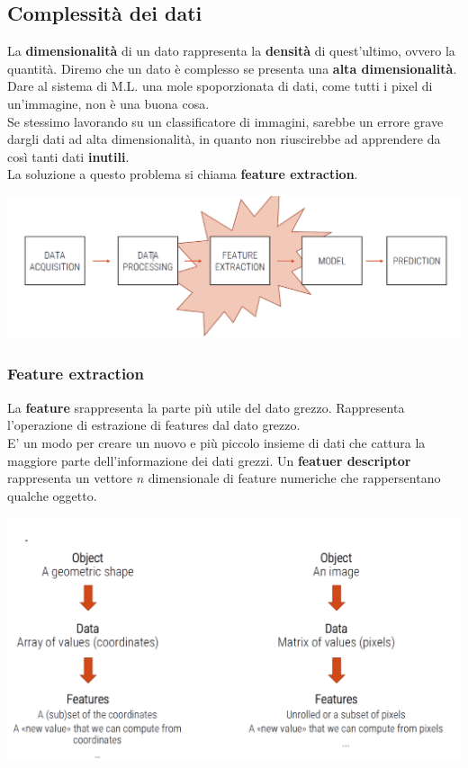 \subsection{Complessità dei dati}
{
    La \textbf{dimensionalità} di un dato rappresenta la 
%
    \textbf{densità} di quest'ultimo, ovvero la quantità.
}
{
    Diremo che un dato è complesso se presenta una 
%
    \textbf{alta dimensionalità}. 
}
Dare al sistema di M.L. una mole spoporzionata di dati, come tutti
%
i pixel di un'immagine, non è una buona cosa.
\\
Se stessimo lavorando su un classificatore di immagini, sarebbe un
%
errore grave dargli dati ad alta dimensionalità, in quanto non 
%
riuscirebbe ad apprendere da così tanti dati \textbf{inutili}.
\\ 
La soluzione a questo problema si chiama \textbf{feature extraction}.
\begin{center}
    \includegraphics[scale=0.5]{images/Feature_extraction.png}
\end{center}
\subsubsection{Feature extraction}
{
    La \textbf{feature} srappresenta la parte più utile del dato 
%
    grezzo.
}
{
    Rappresenta l'operazione di estrazione di features dal dato grezzo.
\\ 
    E' un modo per creare un nuovo e più piccolo insieme di dati 
%
    che cattura la maggiore parte dell'informazione dei dati grezzi.
}
{
    Un \textbf{featuer descriptor} rappresenta un vettore \(n\)
%
    dimensionale di feature numeriche che rappersentano qualche
%
    oggetto.
}
\begin{center}
    \includegraphics[scale=0.5]{images/Feature_example.png}
\end{center}
\newpage
